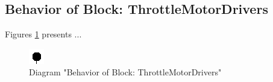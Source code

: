 \subsection{Behavior of Block: ThrottleMotorDrivers}
Figures \ref{fig:ThrottleMotorDriversThrottleMotorDrivers23} presents ...
\begin{figure}[htb]
\centering
\includegraphics[width=\textwidth]{img_2_3.png}
\caption{Diagram "Behavior of Block: ThrottleMotorDrivers"}
\label{fig:ThrottleMotorDriversThrottleMotorDrivers23}
\end{figure}


